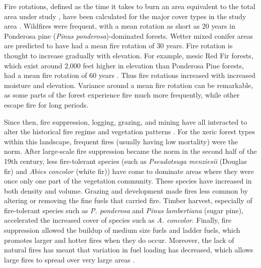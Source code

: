 Fire rotations, defined as the time it takes to burn an area equivalent to the total area under study \citep{Agee1993}, have been calculated for the major cover types in the study area \citep{Mallek2013}. Wildfires were frequent, with a mean rotation as short as 20 years in Ponderosa pine (\emph{Pinus ponderosa})-dominated forests. Wetter mixed conifer areas are predicted to have had a mean fire rotation of 30 years. Fire rotation is thought to increase gradually with elevation. For example, mesic Red Fir forests, which exist around 2,000 feet higher in elevation than Ponderosa Pine forests, had a mean fire rotation of 60 years \citep{Mallek2013}. Thus fire rotations increased with increased moisture and elevation. Variance around a mean fire rotation can be remarkable, as some parts of the forest experience fire much more frequently, while other escape fire for long periods. 

Since then, fire suppression, logging, grazing, and mining have all interacted to alter the historical fire regime and vegetation patterns \citep{Stephens2015,Knapp2013}. For the xeric forest types within this landscape, frequent fires (usually having low mortality) were the norm. After large-scale fire suppression became the norm in the second half of the 19th century, less fire-tolerant species (such as \emph{Pseudotsuga menziesii} (Douglas fir) and \emph{Abies concolor} (white fir)) have come to dominate areas where they were once only one part of the vegetation community. These species have increased in both density and volume. Grazing and development made fires less common by altering or removing the fine fuels that carried fire. Timber harvest, especially of fire-tolerant species such as \emph{P. ponderosa} and \emph{Pinus lambertiana} (sugar pine), accelerated the increased cover of species such as \emph{A. concolor}. Finally, fire suppression allowed the buildup of medium size fuels and ladder fuels, which promotes larger and hotter fires when they do occur. Moreover, the lack of natural fires has meant that variation in fuel loading has decreased, which allows large fires to spread over very large areas \citep{Hessburg2005,Beaty2007,Meyer2008}.





